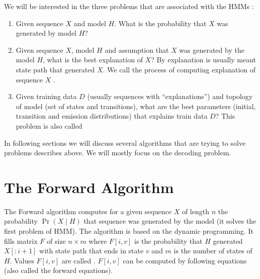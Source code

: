 
We will be interested in the three problems that are associated with the HMMs
\cite{}:
\begin{enumerate}
\item Given sequence $X$ and model $H$. What is the probability that $X$ was
generated by model $H$?
\item Given sequence $X$, model $H$ and assumption that $X$ was generated by the
model
$H$, what is the best explanation of $X$? By explanation is usually meant state
path that generated $X$. We call the process of computing explanation of
sequence $X$ .
\item Given training data $D$ (usually sequences with ``explanations'') and
topology of model (set of states and transitions), what are the best parameters
(initial, transition and emission distributions) that explains train
data $D$? This problem is also called 
\end{enumerate} 
In following sections we will discuss several algorithms
that are trying to solve problems describes above. We will mostly focus on the
decoding problem.


\section{The Forward Algorithm}
The Forward algorithm \cite{Durbin1998} computes for a given sequence $X$ of
length $n$ the probability $\Pr\left(X\mid H\right)$ that sequence was
generated by the model (it solves the first problem of HMM). The algorithm is
based on the dynamic programming. It fills
matrix $F$ of size $n\times m$ where $F[i,v]$ is the probability that $H$
generated $X[:i+1]$ with state path that ends in state $v$ and $m$ is the number
of states of $H$. Values $F[i,v]$ are  called . $F[i,v]$ can be computed by following equations (also called the
forward equations).

